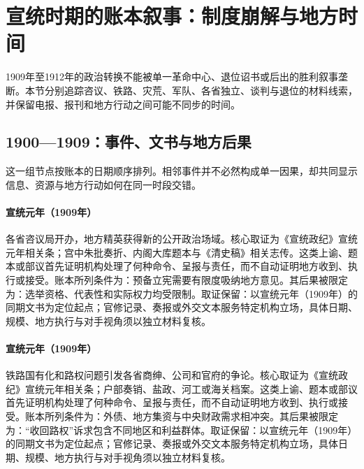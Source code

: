 \section{宣统时期的账本叙事：制度崩解与地方时间}
1909年至1912年的政治转换不能被单一革命中心、退位诏书或后出的胜利叙事垄断。本节分别追踪咨议、铁路、灾荒、军队、各省独立、谈判与退位的材料线索，并保留电报、报刊和地方行动之间可能不同步的时间。
\subsection{1900—1909：事件、文书与地方后果}
这一组节点按账本的日期顺序排列。相邻事件并不必然构成单一因果，却共同显示信息、资源与地方行动如何在同一时段交错。
\hypertarget{ledger:EQ-1909-PROVINCIAL-ASSEMBLIES}{}\paragraph{宣统元年（1909年）}各省咨议局开办，地方精英获得新的公开政治场域。核心取证为《宣统政纪》宣统元年相关条；宫中朱批奏折、内阁大库题本与《清史稿》相关志传。这类上谕、题本或部议首先证明机构处理了何种命令、呈报与责任，而不自动证明地方收到、执行或接受。账本所列条件为：预备立宪需要有限度吸纳地方意见。其后果被限定为：选举资格、代表性和实际权力均受限制。取证保留：以宣统元年（1909年）的同期文书为定位起点；官修记录、奏报或外交文本服务特定机构立场，具体日期、规模、地方执行与对手视角须以独立材料复核。
\hypertarget{ledger:EQ-1909-RAILWAY-RECOVERY-MOVEMENT}{}\paragraph{宣统元年（1909年）}铁路国有化和路权问题引发各省商绅、公司和官府的争论。核心取证为《宣统政纪》宣统元年相关条；户部奏销、盐政、河工或海关档案。这类上谕、题本或部议首先证明机构处理了何种命令、呈报与责任，而不自动证明地方收到、执行或接受。账本所列条件为：外债、地方集资与中央财政需求相冲突。其后果被限定为：“收回路权”诉求包含不同地区和利益群体。取证保留：以宣统元年（1909年）的同期文书为定位起点；官修记录、奏报或外交文本服务特定机构立场，具体日期、规模、地方执行与对手视角须以独立材料复核。
